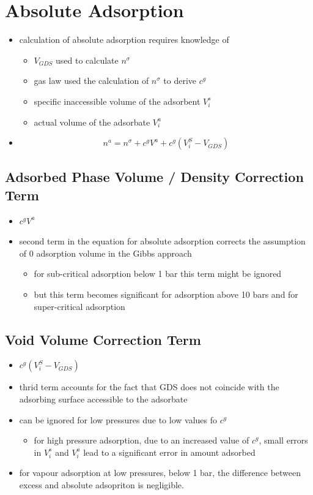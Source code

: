 \documentclass[11pt]{article}
\begin{document}
\section{Absolute Adsorption}
\label{sec:org19c6c65}
\begin{itemize}
\item calculation of absolute adsorption requires knowledge of \cite{Rouquerol2016}
\begin{itemize}
\item \(V_{GDS}\) used to calculate \(n ^{\sigma}\)
\item gas law used the calculation of \(n ^{\sigma}\) to derive \(c ^g\)
\item specific inaccessible volume of the adsorbent \(V _i ^s\)
\item actual volume of the adsorbate \(V _i ^a\)
\end{itemize}
\item $$n ^a = n ^{\sigma} + c ^g V ^a + c ^g ( V _i ^S - V _{GDS} )$$ \cite{Rouquerol2016}
\end{itemize}

\subsection{Adsorbed Phase Volume / Density Correction Term}
\label{sec:org747e58a}
\begin{itemize}
\item \(c ^g V ^a\)
\item second term in the equation for absolute adsorption corrects the assumption of 0 adsorption volume in the Gibbs approach
\begin{itemize}
\item for sub-critical adsorption below 1 bar this term might be ignored
\item but this term becomes significant for adsorption above 10 bars and for super-critical adsorption
\end{itemize}
\end{itemize}

\subsection{Void Volume Correction Term}
\label{sec:org0bed323}
\begin{itemize}
\item \(c ^g ( V _i ^S - V _{GDS} )\)
\item thrid term accounts for the fact that GDS does not coincide with the adsorbing surface accessible to the adsorbate
\item can be ignored for low pressures due to low values fo \(c ^g\)
\begin{itemize}
\item for high pressure adsorption, due to an increased value of \(c ^g\), small errors in \(V _i ^s\) and \(V _i ^a\) lead to a significant error in amount adsorbed
\end{itemize}
\item for vapour adsorption at low pressures, below 1 bar, the difference between excess and absolute adsopriton is negligible.
\end{itemize}
\end{document}
